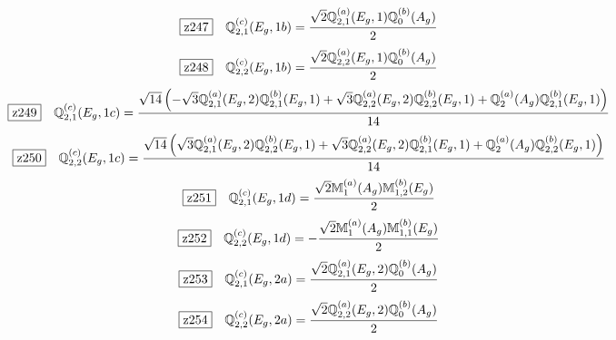 \documentclass[fleqn,10pt,landscape]{jsarticle}
\begin{document}
\begin{dmath*}
\hspace*{3mm}\fbox{z247}\quad \mathbb{Q}_{2,1}^{(c)}(E_{g},1b)=\frac{\sqrt{2} \mathbb{Q}_{2,1}^{(a)}(E_{g},1) \mathbb{Q}_{0}^{(b)}(A_{g})}{2}
\end{dmath*}
\begin{dmath*}
\hspace*{3mm}\fbox{z248}\quad \mathbb{Q}_{2,2}^{(c)}(E_{g},1b)=\frac{\sqrt{2} \mathbb{Q}_{2,2}^{(a)}(E_{g},1) \mathbb{Q}_{0}^{(b)}(A_{g})}{2}
\end{dmath*}
\begin{dmath*}
\hspace*{3mm}\fbox{z249}\quad \mathbb{Q}_{2,1}^{(c)}(E_{g},1c)=\frac{\sqrt{14} \left(- \sqrt{3} \mathbb{Q}_{2,1}^{(a)}(E_{g},2) \mathbb{Q}_{2,1}^{(b)}(E_{g},1) + \sqrt{3} \mathbb{Q}_{2,2}^{(a)}(E_{g},2) \mathbb{Q}_{2,2}^{(b)}(E_{g},1) + \mathbb{Q}_{2}^{(a)}(A_{g}) \mathbb{Q}_{2,1}^{(b)}(E_{g},1)\right)}{14}
\end{dmath*}
\begin{dmath*}
\hspace*{3mm}\fbox{z250}\quad \mathbb{Q}_{2,2}^{(c)}(E_{g},1c)=\frac{\sqrt{14} \left(\sqrt{3} \mathbb{Q}_{2,1}^{(a)}(E_{g},2) \mathbb{Q}_{2,2}^{(b)}(E_{g},1) + \sqrt{3} \mathbb{Q}_{2,2}^{(a)}(E_{g},2) \mathbb{Q}_{2,1}^{(b)}(E_{g},1) + \mathbb{Q}_{2}^{(a)}(A_{g}) \mathbb{Q}_{2,2}^{(b)}(E_{g},1)\right)}{14}
\end{dmath*}
\begin{dmath*}
\hspace*{3mm}\fbox{z251}\quad \mathbb{Q}_{2,1}^{(c)}(E_{g},1d)=\frac{\sqrt{2} \mathbb{M}_{1}^{(a)}(A_{g}) \mathbb{M}_{1,2}^{(b)}(E_{g})}{2}
\end{dmath*}
\begin{dmath*}
\hspace*{3mm}\fbox{z252}\quad \mathbb{Q}_{2,2}^{(c)}(E_{g},1d)=- \frac{\sqrt{2} \mathbb{M}_{1}^{(a)}(A_{g}) \mathbb{M}_{1,1}^{(b)}(E_{g})}{2}
\end{dmath*}
\begin{dmath*}
\hspace*{3mm}\fbox{z253}\quad \mathbb{Q}_{2,1}^{(c)}(E_{g},2a)=\frac{\sqrt{2} \mathbb{Q}_{2,1}^{(a)}(E_{g},2) \mathbb{Q}_{0}^{(b)}(A_{g})}{2}
\end{dmath*}
\begin{dmath*}
\hspace*{3mm}\fbox{z254}\quad \mathbb{Q}_{2,2}^{(c)}(E_{g},2a)=\frac{\sqrt{2} \mathbb{Q}_{2,2}^{(a)}(E_{g},2) \mathbb{Q}_{0}^{(b)}(A_{g})}{2}
\end{dmath*}
\end{document}
